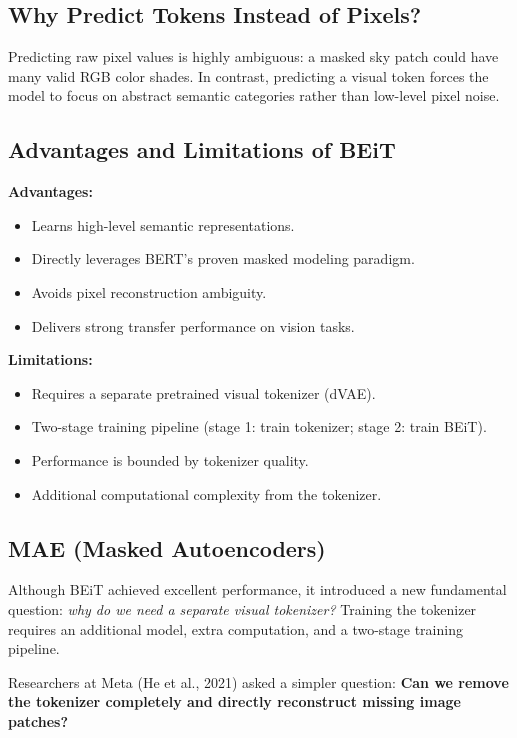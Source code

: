 \subsection{Why Predict Tokens Instead of Pixels?}

Predicting raw pixel values is highly ambiguous: a masked sky patch could have many valid RGB color shades. In contrast, predicting a visual token forces the model to focus on abstract semantic categories rather than low-level pixel noise.

\subsection{Advantages and Limitations of BEiT}

\textbf{Advantages:}
\begin{itemize}
    \item Learns high-level semantic representations.
    \item Directly leverages BERT's proven masked modeling paradigm.
    \item Avoids pixel reconstruction ambiguity.
    \item Delivers strong transfer performance on vision tasks.
\end{itemize}

\textbf{Limitations:}
\begin{itemize}
    \item Requires a separate pretrained visual tokenizer (dVAE).
    \item Two-stage training pipeline (stage 1: train tokenizer; stage 2: train BEiT).
    \item Performance is bounded by tokenizer quality.
    \item Additional computational complexity from the tokenizer.
\end{itemize}

\subsection{MAE (Masked Autoencoders)}

Although BEiT achieved excellent performance, it introduced a new fundamental question: \emph{why do we need a separate visual tokenizer?} Training the tokenizer requires an additional model, extra computation, and a two-stage training pipeline.

Researchers at Meta (He et al., 2021) asked a simpler question: \textbf{Can we remove the tokenizer completely and directly reconstruct missing image patches?}

